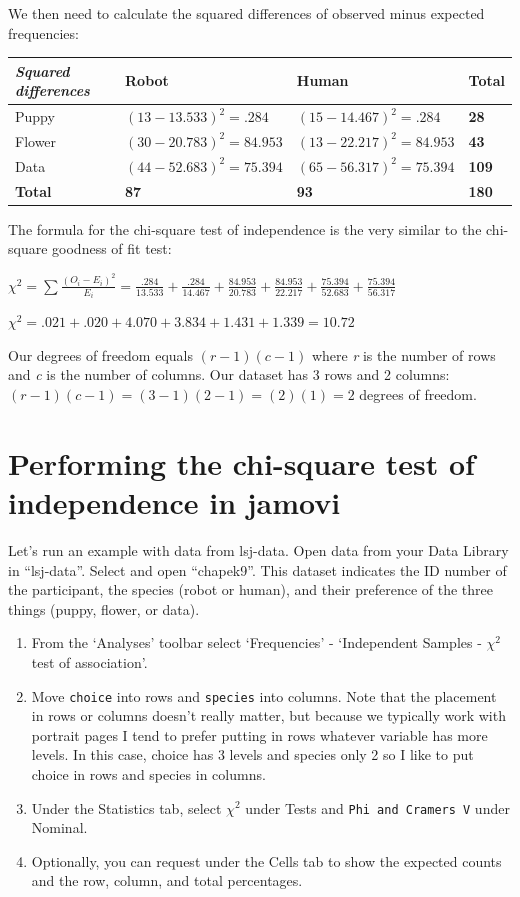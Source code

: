 \documentclass[
]{book}
\begin{document}
We then need to calculate the squared differences of observed minus expected frequencies:

\begin{longtable}[]{@{}llll@{}}
\toprule
\emph{Squared differences} & Robot & Human & Total\tabularnewline
\midrule
\endhead
Puppy & \((13-13.533)^2 = .284\) & \((15-14.467)^2 = .284\) & \textbf{28}\tabularnewline
Flower & \((30-20.783)^2 = 84.953\) & \((13-22.217)^2 = 84.953\) & \textbf{43}\tabularnewline
Data & \((44-52.683)^2 = 75.394\) & \((65-56.317)^2 = 75.394\) & \textbf{109}\tabularnewline
\textbf{Total} & \textbf{87} & \textbf{93} & \textbf{180}\tabularnewline
\bottomrule
\end{longtable}

The formula for the chi-square test of independence is the very similar to the chi-square goodness of fit test:

\(\chi^2 = \sum{\frac{(O_i-E_i)^2}{E_i}} = \frac{.284}{13.533} + \frac{.284}{14.467} + \frac{84.953}{20.783} + \frac{84.953}{22.217} + \frac{75.394}{52.683} + \frac{75.394}{56.317}\)

\(\chi^2 = .021 + .020 + 4.070 + 3.834 + 1.431 + 1.339 = 10.72\)

Our degrees of freedom equals \((r-1)(c-1)\) where \emph{r} is the number of rows and \emph{c} is the number of columns. Our dataset has 3 rows and 2 columns: \((r-1)(c-1) = (3-1)(2-1) = (2)(1) = 2\) degrees of freedom.

\hypertarget{performing-the-chi-square-test-of-independence-in-jamovi}{%
\section{Performing the chi-square test of independence in jamovi}\label{performing-the-chi-square-test-of-independence-in-jamovi}}

Let's run an example with data from lsj-data. Open data from your Data Library in ``lsj-data''. Select and open ``chapek9''. This dataset indicates the ID number of the participant, the species (robot or human), and their preference of the three things (puppy, flower, or data).

\begin{enumerate}
\def\labelenumi{\arabic{enumi}.}
\item
  From the `Analyses' toolbar select `Frequencies' - `Independent Samples - \(\chi^2\) test of association'.
\item
  Move \texttt{choice} into rows and \texttt{species} into columns. Note that the placement in rows or columns doesn't really matter, but because we typically work with portrait pages I tend to prefer putting in rows whatever variable has more levels. In this case, choice has 3 levels and species only 2 so I like to put choice in rows and species in columns.
\item
  Under the Statistics tab, select \(\chi^2\) under Tests and \texttt{Phi\ and\ Cramer\textquotesingle{}s\ V} under Nominal.
\item
  Optionally, you can request under the Cells tab to show the expected counts and the row, column, and total percentages.
\end{enumerate}
\end{document}

